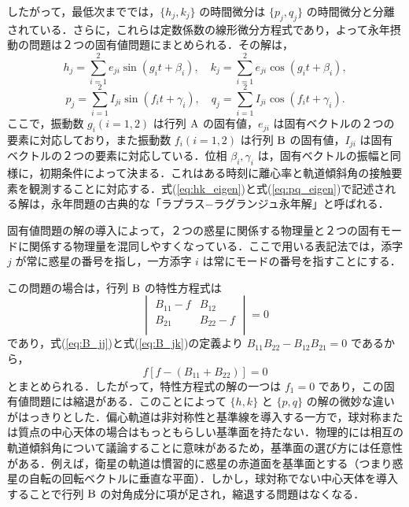 \documentclass[11pt,a4paper,oneside,onecolumn]{jreport}
\begin{document}
したがって，最低次まででは，$\{ h_j, k_j \}$ の時間微分は $\{ p_j, q_j \}$ の時間微分と分離されている．さらに，これらは定数係数の線形微分方程式であり，よって永年摂動の問題は２つの固有値問題にまとめられる．その解は，
\begin{equation}
h_j = \sum_{i = 1}^2 e_{ji} \sin (g_i t + \beta_i), \quad k_j = \sum_{i=1}^2 e_{ji} \cos (g_i t + \beta_i), \label{eq:hk_eigen}
\end{equation}
\begin{equation}
p_j = \sum_{i = 1}^2 I_{ji} \sin (f_i t + \gamma_i), \quad q_j = \sum_{i=1}^2 I_{ji} \cos (f_i t + \gamma_i). \label{eq:pq_eigen}
\end{equation}
ここで，振動数 $g_i (i = 1, 2)$ は行列 ${\rm A}$ の固有値，$e_{ji}$ は固有ベクトルの２つの要素に対応しており，また振動数 $f_i (i = 1, 2)$ は行列 ${\rm B}$ の固有値，$I_{ji}$ は固有ベクトルの２つの要素に対応している．位相 $\beta_i, \gamma_i$ は，固有ベクトルの振幅と同様に，初期条件によって決まる．これはある時刻に離心率と軌道傾斜角の接触要素を観測することに対応する．式(\ref{eq:hk_eigen})と式(\ref{eq:pq_eigen})で記述される解は，永年問題の古典的な「ラプラス−ラグランジュ永年解」と呼ばれる．

固有値問題の解の導入によって，２つの惑星に関係する物理量と２つの固有モードに関係する物理量を混同しやすくなっている．ここで用いる表記法では，添字 $j$ が常に惑星の番号を指し，一方添字 $i$ は常にモードの番号を指すことにする．

この問題の場合は，行列 ${\rm B}$ の特性方程式は
\begin{equation}
\begin{vmatrix}
B_{11} - f & B_{12} \\
B_{21} & B_{22} - f \\
\end{vmatrix}
= 0
\end{equation}
であり，式(\ref{eq:B_jj})と式(\ref{eq:B_jk})の定義より $B_{11} B_{22} - B_{12} B_{21} = 0$ であるから，
\begin{equation}
f \left[ f - (B_{11} + B_{22}) \right] = 0
\end{equation}
とまとめられる．したがって，特性方程式の解の一つは $f_1 = 0$ であり，この固有値問題には縮退がある．このことによって $\{ h, k \}$ と $\{ p, q \}$ の解の微妙な違いがはっきりとした．偏心軌道は非対称性と基準線を導入する一方で，球対称または質点の中心天体の場合はもっともらしい基準面を持たない．物理的には相互の軌道傾斜角について議論することに意味があるため，基準面の選び方には任意性がある．例えば，衛星の軌道は慣習的に惑星の赤道面を基準面とする（つまり惑星の自転の回転ベクトルに垂直な平面）．しかし，球対称でない中心天体を導入することで行列 ${\rm B}$ の対角成分に項が足され，縮退する問題はなくなる． 
\end{document}
